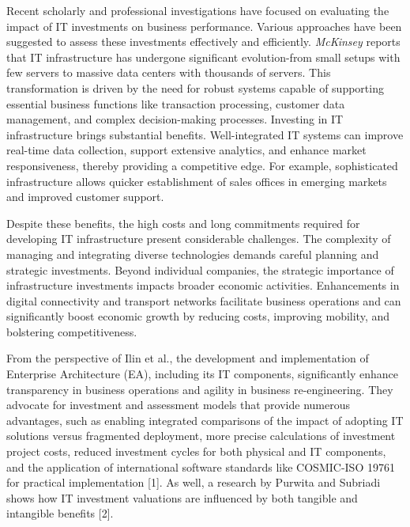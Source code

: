 {Recent scholarly and professional investigations have focused on
evaluating the impact of IT investments on business performance. Various
approaches have been suggested to assess these investments effectively
and efficiently. \emph{McKinsey} reports that IT infrastructure has
undergone significant evolution-from small setups with few servers to
massive data centers with thousands of servers. This transformation is
driven by the need for robust systems capable of supporting essential
business functions like transaction processing, customer data
management, and complex decision-making processes. Investing in IT
infrastructure brings substantial benefits. Well-integrated IT systems
can improve real-time data collection, support extensive analytics, and
enhance market responsiveness, thereby providing a competitive edge. For
example, sophisticated infrastructure allows quicker establishment of
sales offices in emerging markets and improved customer support.

Despite these benefits, the high costs and long commitments required for
developing IT infrastructure present considerable challenges. The
complexity of managing and integrating diverse technologies demands
careful planning and strategic investments. Beyond individual companies,
the strategic importance of infrastructure investments impacts broader
economic activities. Enhancements in digital connectivity and transport
networks facilitate business operations and can significantly boost
economic growth by reducing costs, improving mobility, and bolstering
competitiveness.

From the perspective of Ilin et al., the development and implementation
of Enterprise Architecture (EA), including its IT components,
significantly enhance transparency in business operations and agility in
business re-engineering. They advocate for investment and assessment
models that provide numerous advantages, such as enabling integrated
comparisons of the impact of adopting IT solutions versus fragmented
deployment, more precise calculations of investment project costs,
reduced investment cycles for both physical and IT components, and the
application of international software standards like COSMIC-ISO 19761
for practical implementation {[}1{]}. As well, a research by Purwita and
Subriadi shows how IT investment valuations are influenced by both
tangible and intangible benefits {[}2{]}.

}
